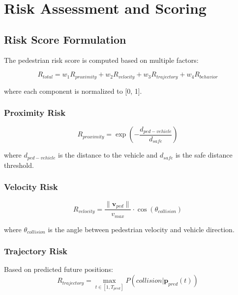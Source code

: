 \documentclass[11pt,a4paper]{article}
\begin{document}
\section{Risk Assessment and Scoring}

\subsection{Risk Score Formulation}

The pedestrian risk score is computed based on multiple factors:

\begin{equation}
R_{total} = w_1 R_{proximity} + w_2 R_{velocity} + w_3 R_{trajectory} + w_4 R_{behavior}
\end{equation}

where each component is normalized to [0, 1].

\subsubsection{Proximity Risk}

\begin{equation}
R_{proximity} = \exp\left(-\frac{d_{ped-vehicle}}{d_{safe}}\right)
\end{equation}

where $d_{ped-vehicle}$ is the distance to the vehicle and $d_{safe}$ is the safe distance threshold.

\subsubsection{Velocity Risk}

\begin{equation}
R_{velocity} = \frac{\|\mathbf{v}_{ped}\|}{v_{max}} \cdot \cos(\theta_{collision})
\end{equation}

where $\theta_{collision}$ is the angle between pedestrian velocity and vehicle direction.

\subsubsection{Trajectory Risk}

Based on predicted future positions:
\begin{equation}
R_{trajectory} = \max_{t \in [1, T_{pred}]} P(collision | \mathbf{p}_{pred}(t))
\end{equation}
\end{document}
